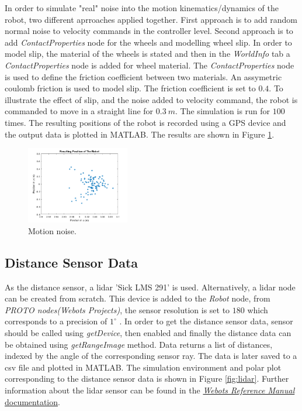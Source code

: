 \documentclass[11pt]{article}
\begin{document}
    In order to simulate "real" noise into the motion kinematics/dynamics of the robot, two different aprroaches applied together. First approach is to add random normal noise to velocity commands in the controller level. Second approach is to add \emph{ContactProperties} node for the wheels and modelling wheel slip. In order to model slip, the material of the wheels is stated and then in the \emph{WorldInfo} tab a \emph{ContactProperties} node is added for wheel material. The \emph{ContactProperties} node is used to define the friction coefficient between two materials. An assymetric coulomb friction is used to model slip. The friction coefficient is set to $0.4$. To illustrate the effect of slip, and the noise added to velocity command, the robot is commanded to move in a straight line for $0.3 \ m$.
    The simulation is run for $100$ times. The resulting positions of the robot is recorded using a GPS device and the output data is plotted in MATLAB. The results are shown in Figure \ref{fig:motion-noise}.
    \\ 

    \begin{figure}[ht!]
        \centering
        \includegraphics[width = 0.4\textwidth]{motion-noise.png}
        \caption{Motion noise.}
        \label{fig:motion-noise} 
    \end{figure}
 
    \subsection{Distance Sensor Data}
    As the distance sensor, a lidar 'Sick LMS 291' is used. Alternatively, a lidar node can be created from scratch. This device is added to the \emph{Robot} node, from \emph{PROTO nodes(Webots Projects)}, the sensor resolution is set to $180$ which corresponds to a precision of $1^{\circ}$ .
    In order to get the distance sensor data, sensor should be called using \emph{getDevice}, then enabled and finally the distance data can be obtained using \emph{getRangeImage} method.
    Data returns a list of distances, indexed by the angle of the corresponding sensor ray. The data is later saved to a csv file and plotted in MATLAB. The simulation environment and polar plot corresponding to the distance sensor data is shown in Figure \ref{fig:lidar}.
    Further information about the lidar sensor can be found in the \href{https://cyberbotics.com/doc/reference/lidar}{\emph{Webots Reference Manual} documentation}.
    
\end{document}
